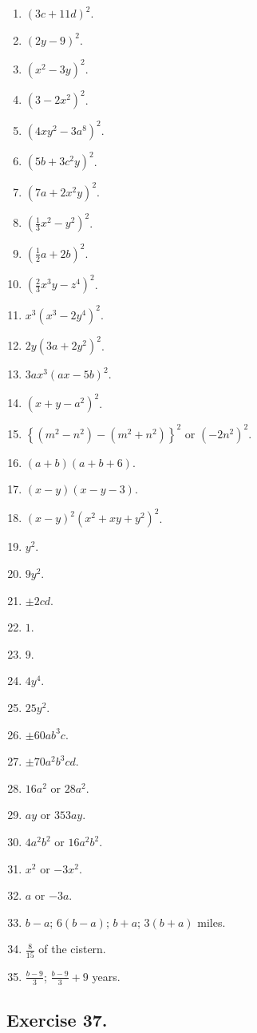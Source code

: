 \documentclass{book}
\begin{document}
\begin{enumerate}
\item $\left(3c+11d\right)^2$.
\item $\left(2y-9\right)^2$.
\item $\left(x^2-3y\right)^2$.
\item $\left(3-2x^2\right)^2$.
\item $\left(4xy^2-3a^8\right)^2$.
\item $\left(5b+3c^2y\right)^2$.
\item $\left(7a+2x^2y\right)^2$.
\item $\left(\frac{1}{3}x^2-y^2\right)^2$.
\item $\left(\frac{1}{2}a+2b\right)^2$.
\item $\left(\frac{2}{3}x^3y-z^4\right)^2$.
\item $x^3\left(x^3-2y^4\right)^2$.
\item $2y\left(3a+2y^2\right)^2$.
\item $3ax^3\left(ax-5b\right)^2$.
\item $\left(x+y-a^2\right)^2$.
\item $\left\{(m^2-n^2)-(m^2+n^2)\right\}^2$ or $\left(-2n^2\right)^2$.
\item $(a+b)(a+b+6)$.
\item $(x-y)(x-y-3)$.
\item $\left(x-y\right)^2\left(x^2+xy+y^2\right)^2$.
\item $y^2$.
\item $9y^2$.
\item $\pm 2cd$.
\item $1$.
\item $9$.
\item $4y^4$.
\item $25y^2$.
\item $\pm 60ab^3c$.
\item $\pm 70a^2b^3cd$.
\item $16a^2$ or $28a^2$.
\item $ay$ or $353ay$.
\item $4a^2b^2$ or $16a^2b^2$.
\item $x^2$ or $-3x^2$.
\item $a$ or $-3a$.
\item $b-a$; $6(b-a)$; $b+a$; $3(b+a)$ miles.
\item $\frac{8}{15}$ of the cistern.
\item $\frac{b-9}{3}$; $\frac{b-9}{3}+9$ years.
\end{enumerate}

\subsection*{Exercise 37.}
\end{document}
